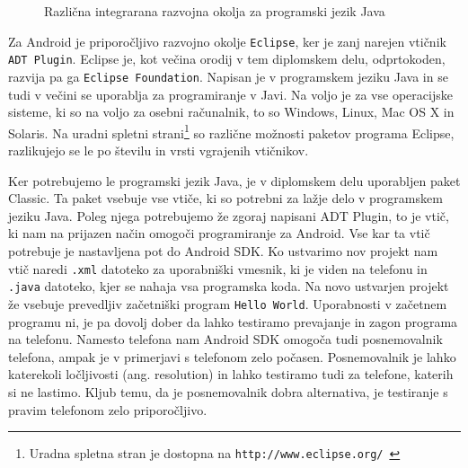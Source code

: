 \documentclass[a4paper, 12pt]{book}
\begin{document}
\begin{figure}[h]
	\centering
	 \hfill
	 \hfill
	 \hfill
	\caption{Različna integrarana razvojna okolja za programski jezik Java}
	\label{picIDE}
\end{figure}

Za Android je priporočljivo razvojno okolje {\tt Eclipse}, ker je zanj narejen vtičnik {\tt ADT Plugin}. 
Eclipse je, kot večina orodij v tem diplomskem delu, odprtokoden, razvija pa ga {\tt Eclipse Foundation}. Napisan je v programskem jeziku Java in se tudi v večini se uporablja za programiranje v Javi. Na voljo je za vse operacijske sisteme, ki so na voljo za osebni računalnik, to so Windows, Linux, Mac OS X in Solaris. Na uradni spletni strani\footnote{Uradna spletna stran je dostopna na {\tt http://www.eclipse.org/}~\cite{bibEclipse}} so različne možnosti paketov programa Eclipse, razlikujejo se le po številu in vrsti vgrajenih vtičnikov. 

Ker potrebujemo le programski jezik Java, je v diplomskem delu u\-po\-rab\-ljen paket Classic. Ta paket vsebuje vse vtiče, ki so potrebni za lažje delo v programskem jeziku Java. Poleg njega potrebujemo že zgoraj napisani ADT Plugin, to je vtič, ki nam na prijazen način omogoči programiranje za Android. Vse kar ta vtič potrebuje je nastavljena pot do Android SDK. Ko ustvarimo nov projekt nam vtič naredi {\tt .xml} datoteko za uporabniški vmesnik, ki je viden na telefonu in {\tt .java} datoteko, kjer se nahaja vsa programska koda. Na novo ustvarjen projekt že vsebuje prevedljiv začetniški program {\tt Hello World}. Uporabnosti v začetnem programu ni, je pa dovolj dober da lahko testiramo prevajanje in zagon programa na telefonu. Namesto telefona nam Android SDK omogoča tudi posnemovalnik telefona, ampak je v primerjavi s telefonom zelo počasen. Posnemovalnik je lahko katerekoli ločljivosti (ang. resolution) in lahko testiramo tudi za telefone, katerih si ne lastimo. Kljub temu, da je posnemovalnik dobra alternativa, je testiranje s pravim telefonom zelo priporočljivo. 
\end{document}
